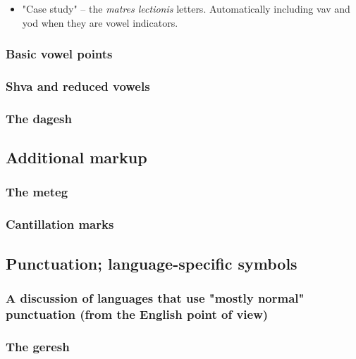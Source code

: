 \documentclass[11pt]{article}
\begin{document}
\begin{itemize}
\item "Case study" -- the \emph{matres lectionis} letters. Automatically including vav and yod when they are vowel indicators.
\end{itemize}

\subsubsection{Basic vowel points}
\label{sec:org547f725}

\subsubsection{Shva and reduced vowels}
\label{sec:org6d6317e}

\subsubsection{The dagesh}
\label{sec:org23ef01a}

\subsection{Additional markup}
\label{sec:org95c96d1}

\subsubsection{The meteg}
\label{sec:orgd6499e6}

\subsubsection{Cantillation marks}
\label{sec:orgd7a9f65}

\subsection{Punctuation; language-specific symbols}
\label{sec:org34812db}

\subsubsection{A discussion of languages that use "mostly normal" punctuation (from the English point of view)}
\label{sec:orgd61587e}

\subsubsection{The geresh}
\label{sec:org4722172}
\end{document}
